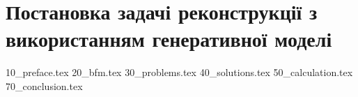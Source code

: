 \chapter{Постановка задачі реконструкції з використанням генеративної моделі}
{10_preface.tex}
{20_bfm.tex}
{30_problems.tex}
{40_solutions.tex}
{50_calculation.tex}
{70_conclusion.tex}

